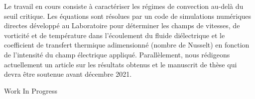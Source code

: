 {Le travail en cours consiste à caractériser les régimes de convection au-delà du seuil critique. Les équations sont résolues par un code de simulations numériques directes développé au Laboratoire pour déterminer les champs de vitesses, de vorticité et de température dans l'écoulement du fluide diélectrique et le coefficient de transfert thermique adimensionné (nombre de Nusselt) en fonction de l'intensité du champ électrique appliqué. Parallèlement, nous rédigeons actuellement un article sur les résultats obtenus et le manuscrit de thèse qui devra être soutenue avant décembre 2021.

 \vfill Work In Progress

}
 
